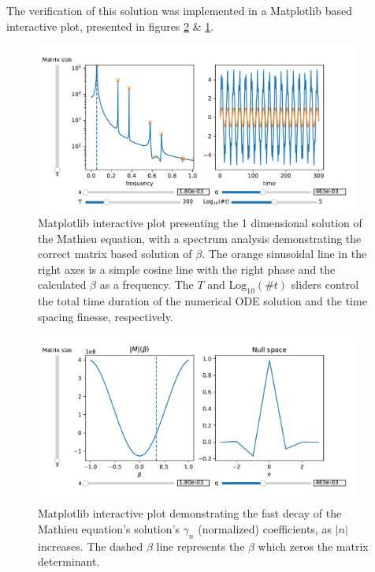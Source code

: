 The verification of this solution was implemented in a Matplotlib\cite{Matplotlib} based interactive plot, presented in figures \ref{fig:pure-mathieu-coefficients} \& \ref{fig:pure-mathieu-fft}.

\begin{figure}
	\begin{center}
		\includegraphics[width=0.95\textwidth]{graphics/pure-mathieu-fft.pdf}
	\end{center}
	\caption{Matplotlib interactive plot presenting the 1 dimensional solution of the Mathieu equation, with a spectrum analysis demonstrating the correct matrix based solution of $\beta$. The orange sinusoidal line in the right axes is a simple cosine line with the right phase and the calculated $\beta$ as a frequency. The $T$ and $\mathrm{Log}_{10}(\#t)$ sliders control the total time duration of the numerical ODE solution and the time spacing finesse, respectively.}
	\label{fig:pure-mathieu-fft}
\end{figure}

\begin{figure}
	\begin{center}
		\includegraphics[width=0.95\textwidth]{graphics/pure-mathieu-kernel.pdf}
	\end{center}
	\caption{Matplotlib interactive plot demonstrating the fast decay of the Mathieu equation's solution's $\gamma_n$ (normalized) coefficients, as $|n|$ increases. The dashed $\beta$ line represents the $\beta$ which zeros the matrix determinant.}
	\label{fig:pure-mathieu-coefficients}
\end{figure}

